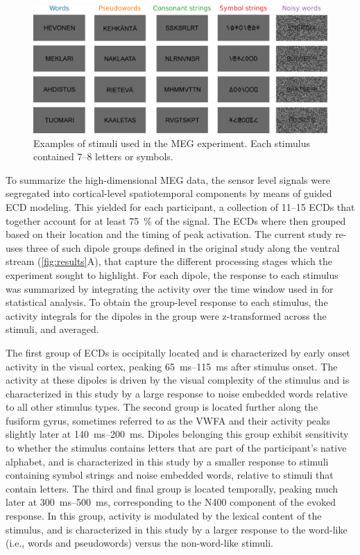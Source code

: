 \documentclass[a4paper, 10pt]{vanvliet_paper}
\begin{document}
\begin{figure}
    \includegraphics[width=\textwidth]{stimuli.pdf}
    \caption{Examples of stimuli used in the \gls{MEG} experiment. Each stimulus contained 7--8 letters or symbols.}\label{fig:stimuli}
\end{figure}

To summarize the high-dimensional \gls{MEG} data, the sensor level signals were segregated into cortical-level spatiotemporal components by means of guided \gls{ECD} modeling\cite{Hamalainen1993}.
This yielded for each participant, a collection of 11--15 \glspl{ECD} that together account for at least \SI{75}{\percent} of the signal.
The \glspl{ECD} where then grouped based on their location and the timing of peak activation. 
The current study re-uses three of such dipole groups defined in the original study\cite{Vartiainen2011} along the ventral stream (\autoref{fig:results}A), that capture the different processing stages which the experiment sought to highlight.
For each dipole, the response to each stimulus was summarized by integrating the activity over the time window used in \textcite{Vartiainen2011} for statistical analysis.
To obtain the group-level response to each stimulus, the activity integrals for the dipoles in the group were z-transformed across the stimuli, and averaged.

The first group of \glspl{ECD} is occipitally located and is characterized by early onset activity in the visual cortex, peaking \SIrange{65}{115}{\milli\second} after stimulus onset.
The activity at these dipoles is driven by the visual complexity of the stimulus and is characterized in this study by a large response to noise embedded words relative to all other stimulus types.
The second group is located further along the fusiform gyrus, sometimes referred to as the \gls{VWFA}\cite{Cohen2004} and their activity peaks slightly later at \SIrange{140}{200}{\milli\second}.
Dipoles belonging this group exhibit sensitivity to whether the stimulus contains letters that are part of the participant's native alphabet\cite{Tarkiainen1999}, and is characterized in this study by a smaller response to stimuli containing symbol strings and noise embedded words, relative to stimuli that contain letters.
The third and final group is located temporally, peaking much later at \SIrange{300}{500}{\milli\second}, corresponding to the N400 component of the evoked response\cite{Halgren2002, Helenius1998b, Service2007}.
In this group, activity is modulated by the lexical content of the stimulus, and is characterized in this study by a larger response to the word-like (i.e., words and pseudowords) versus the non-word-like stimuli.
\end{document}
